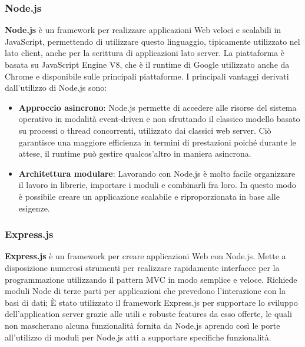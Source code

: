 \subsubsection{Node.js}
\textbf{Node.js} è un framework per realizzare applicazioni Web veloci e scalabili in JavaScript, permettendo di utilizzare questo linguaggio, tipicamente utilizzato nel lato client, anche per la scrittura di applicazioni lato server.
La piattaforma è basata su JavaScript Engine V8, che è il runtime di Google utilizzato anche da Chrome e disponibile sulle principali piattaforme. \newline
I principali vantaggi derivati dall'utilizzo di Node.js sono:
\begin{itemize}
	\item \textbf{Approccio asincrono}: Node.js permette di accedere alle risorse del sistema operativo in modalità event-driven e non sfruttando il classico modello basato su processi o thread concorrenti, utilizzato dai classici web server. Ciò garantisce una maggiore efficienza in termini di prestazioni poiché durante le attese, il runtime può gestire qualcos’altro in maniera asincrona.
	\item \textbf{Architettura modulare}: Lavorando con Node.js è molto facile organizzare il lavoro in librerie, importare i moduli e combinarli fra loro. In questo modo è possibile creare un applicazione scalabile e riproporzionata in base alle esigenze.
\end{itemize}

\subsubsection{Express.js}
\textbf{Express.js} è un framework per creare applicazioni Web con Node.js.
Mette a disposizione numerosi strumenti per realizzare rapidamente interfacce per la programmazione utilizzando il pattern MVC in modo semplice e veloce. Richiede moduli Node di terze parti per applicazioni che prevedono l’interazione con la basi di dati; \newline
\`E stato utilizzato il framework Express.js per supportare lo sviluppo dell'application server grazie alle utili e robuste features da esso offerte, le quali non mascherano alcuna funzionalità fornita da Node.js aprendo così le porte all'utilizzo di moduli per Node.js atti a supportare specifiche
funzionalità.


